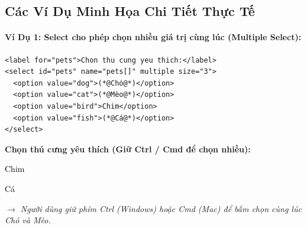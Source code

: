 \subsection{Các Ví Dụ Minh Họa Chi Tiết Thực Tế}

\paragraph{Ví Dụ 1: Select cho phép chọn nhiều giá trị cùng lúc (Multiple Select):}

\begin{codeWindow}
\begin{lstlisting}[language=HTML5]
<label for="pets">Chon thu cung yeu thich:</label>
<select id="pets" name="pets[]" multiple size="3">
  <option value="dog">(*@Chó@*)</option>
  <option value="cat">(*@Mèo@*)</option>
  <option value="bird">Chim</option>
  <option value="fish">(*@Cá@*)</option>
</select>
\end{lstlisting}
\end{codeWindow}

\begin{browserWindow}
\sffamily\small
\textbf{Chọn thú cưng yêu thích (Giữ Ctrl / Cmd để chọn nhiều):} \par\vspace{4pt}
\begin{tcolorbox}[arc=2pt, colback=white, colframe=primaryBlue!50, boxsep=3pt, width=0.55\linewidth]
  \small
   \par\vspace{2pt}
   \par\vspace{2pt}
  \textcolor{black}{Chim} \par\vspace{2pt}
  \textcolor{black}{Cá}
\end{tcolorbox}
\par\vspace{4pt}
\textcolor{codeComment}{\small\textit{$\rightarrow$ Người dùng giữ phím Ctrl (Windows) hoặc Cmd (Mac) để bấm chọn cùng lúc Chó và Mèo.}}
\end{browserWindow}


